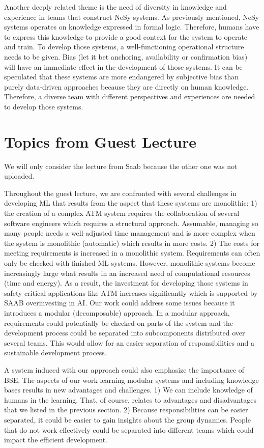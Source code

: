 \documentclass[11pt]{article}
\begin{document}
Another deeply related theme is the need of diversity in knowledge and experience in teams that construct \ac{NeSy} systems. As previously mentioned, \ac{NeSy} systems operates on knowledge expressed in formal logic. Therefore, humans have to express this knowledge to provide a good context for the system to operate and train. To develop those systems, a well-functioning operational structure needs to be given. Bias (let it bet anchoring, availability or confirmation bias) will have an immediate effect in the development of those systems. It can be speculated that these systems are more endangered by subjective bias than purely data-driven approaches because they are directly on human knowledge. Therefore, a diverse team with different perspectives and experiences are needed to develop those systems.

\section*{Topics from Guest Lecture}

We will only consider the lecture from Saab because the other one was not uploaded.

Throughout the guest lecture, we are confronted with several challenges in developing \ac{ML} that results from the aspect that these systems are monolithic: 1) the creation of a complex ATM system requires the collaboration of several software engineers which requires a structural approach. Assumable, managing so many people needs a well-adjusted time management and is more complex when the system is monolithic (automatic) which results in more costs. 2) The costs for meeting requirements is increased in a monolithic system. Requirements can often only be checked with finished \ac{ML} systems. However, monolithic systems become increasingly large what results in an increased need of computational resources (time and energy). As a result, the investment for developing those systems in safety-critical applications like ATM increases significantly which is supported by SAAB overinvesting in \ac{AI}. Our work could address some issues because it introduces a modular (decomposable) approach. In a modular approach, requirements could potentially be checked on parts of the system and the development process could be separated into subcomponents distributed over several teams. This would allow for an easier separation of responsibilities and a sustainable development process.

A system induced with our approach could also emphasize the importance of \ac{BSE}. The aspects of our work learning modular systems and including knowledge bases results in new advantages and challenges. 1) We can include knowledge of humans in the learning. That, of course, relates to advantages and disadvantages that we listed in the previous section. 2) Because responsibilities can be easier separated, it could be easier to gain insights about the group dynamics. People that do not work effectively could be separated into different teams which could impact the efficient development.
\end{document}
